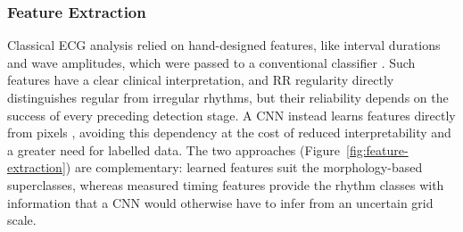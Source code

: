 \documentclass[12pt,nonacm,acmlarge,titlepage,screen]{acmart}
\begin{document}
\subsubsection{Feature Extraction}
\label{sec:features}

Classical ECG analysis relied on hand-designed features, like interval durations and wave amplitudes, which were passed to a conventional classifier \cite{de_chazal_automatic_2004}. Such features have a clear clinical interpretation, and RR regularity directly distinguishes regular from irregular rhythms, but their reliability depends on the success of every preceding detection stage. A CNN instead learns features directly from pixels \cite{lecun_deep_2015}, avoiding this dependency at the cost of reduced interpretability and a greater need for labelled data. The two approaches (Figure~\ref{fig:feature-extraction}) are complementary: learned features suit the morphology-based superclasses, whereas measured timing features provide the rhythm classes with information that a CNN would otherwise have to infer from an uncertain grid scale.
\end{document}
